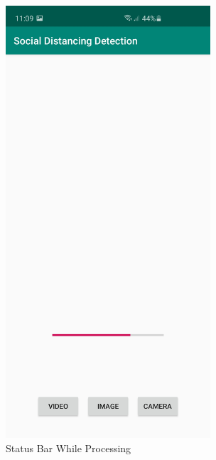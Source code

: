     \begin{figure}[h!]
        \centering
        \begin{subfigure}{.5\textwidth}
        \centering
        \includegraphics[width=3in]{images/appendix-b/sh-processing.jpg}
        \caption{Status Bar While Processing}
        \label{appendix-b:statusBar}
        \end{subfigure}%
        \begin{subfigure}{.5\textwidth}
        \centering

\end{subfigure}
\end{figure}
